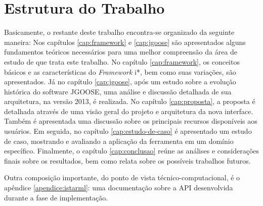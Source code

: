     \section{Estrutura do Trabalho}
        \label{cap:introducao:sec:organizacao}
        Basicamente,
        o restante deste trabalho encontra-se organizado da seguinte maneira:
            Nos capítulos \ref{cap:framework} e \ref{cap:jgoose} são apresentados alguns fundamentos teóricos necessários para uma melhor compreensão da área de estudo de que trata este trabalho.  No capítulo \ref{cap:framework}, os conceitos básicos e as características do \emph{Framework} i*, bem como suas variações, são apresentados.  Já no capítulo \ref{cap:jgoose}, após um estudo sobre a evolução histórica do software JGOOSE, uma análise e discussão detalhada de sua arquitetura, na versão 2013, é realizada.
            No capítulo \ref{cap:proposta}, a proposta é detalhada através de uma visão geral do projeto e arquitetura da nova interface. Também é apresentada uma discussão sobre os principais recursos disponíveis aos usuários.
            Em seguida, no capítulo \ref{cap:estudo-de-caso} é apresentado um estudo de caso, mostrando e avaliando a aplicação da ferramenta em um domínio específico.
            Finalmente, o capítulo \ref{cap:conclusao} reúne as análises e considerações finais sobre os resultados, bem como relata sobre os possíveis trabalhos futuros.

        Outra composição importante, do ponto de vista técnico-computacional, é o apêndice \ref{apendice:istarml}: uma documentação sobre a API desenvolvida durante a fase de implementação.
        